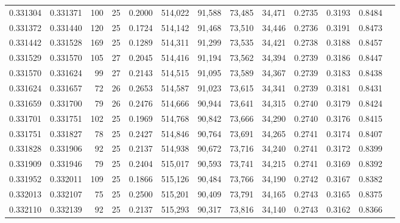 \begin{tabular}{rrrrrrrrrrrrr}
0.331304 & 0.331371 &   100 &  25 &                                     0.2000 & 514,022 &  91,588 &  73,485 &  34,471 & 0.2735 & 0.3193 & 0.8484 \\
0.331372 & 0.331440 &   120 &  25 &                                     0.1724 & 514,142 &  91,468 &  73,510 &  34,446 & 0.2736 & 0.3191 & 0.8473 \\
0.331442 & 0.331528 &   169 &  25 &                                     0.1289 & 514,311 &  91,299 &  73,535 &  34,421 & 0.2738 & 0.3188 & 0.8457 \\
0.331529 & 0.331570 &   105 &  27 &                                     0.2045 & 514,416 &  91,194 &  73,562 &  34,394 & 0.2739 & 0.3186 & 0.8447 \\
0.331570 & 0.331624 &    99 &  27 &                                     0.2143 & 514,515 &  91,095 &  73,589 &  34,367 & 0.2739 & 0.3183 & 0.8438 \\
0.331624 & 0.331657 &    72 &  26 &                                     0.2653 & 514,587 &  91,023 &  73,615 &  34,341 & 0.2739 & 0.3181 & 0.8431 \\
0.331659 & 0.331700 &    79 &  26 &                                     0.2476 & 514,666 &  90,944 &  73,641 &  34,315 & 0.2740 & 0.3179 & 0.8424 \\
0.331701 & 0.331751 &   102 &  25 &                                     0.1969 & 514,768 &  90,842 &  73,666 &  34,290 & 0.2740 & 0.3176 & 0.8415 \\
0.331751 & 0.331827 &    78 &  25 &                                     0.2427 & 514,846 &  90,764 &  73,691 &  34,265 & 0.2741 & 0.3174 & 0.8407 \\
0.331828 & 0.331906 &    92 &  25 &                                     0.2137 & 514,938 &  90,672 &  73,716 &  34,240 & 0.2741 & 0.3172 & 0.8399 \\
0.331909 & 0.331946 &    79 &  25 &                                     0.2404 & 515,017 &  90,593 &  73,741 &  34,215 & 0.2741 & 0.3169 & 0.8392 \\
0.331952 & 0.332011 &   109 &  25 &                                     0.1866 & 515,126 &  90,484 &  73,766 &  34,190 & 0.2742 & 0.3167 & 0.8382 \\
0.332013 & 0.332107 &    75 &  25 &                                     0.2500 & 515,201 &  90,409 &  73,791 &  34,165 & 0.2743 & 0.3165 & 0.8375 \\
0.332110 & 0.332139 &    92 &  25 &                                     0.2137 & 515,293 &  90,317 &  73,816 &  34,140 & 0.2743 & 0.3162 & 0.8366 \\

\end{tabular}
